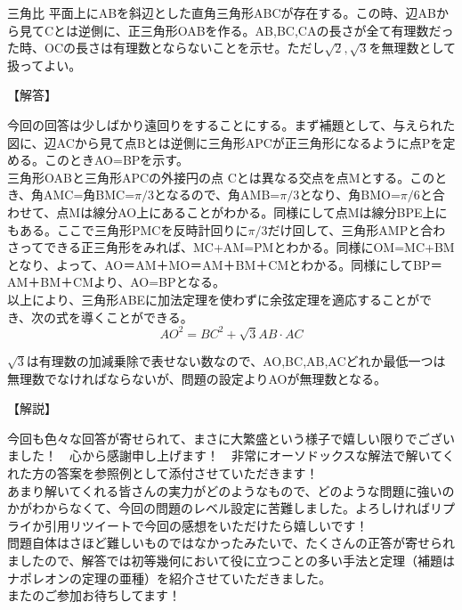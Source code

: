 \documentclass[a4paper,fleqn,dvipdfmx]{jsarticle}
\begin{document}
\newpage

\begin{itembox}[l]{三角比}
平面上にABを斜辺とした直角三角形ABCが存在する。この時、辺ABから見てCとは逆側に、正三角形OABを作る。AB,BC,CAの長さが全て有理数だった時、OCの長さは有理数とならないことを示せ。ただし$\sqrt{2},\sqrt{3}$を無理数として扱ってよい。
\end{itembox}


\begin{flushleft}
【解答】
\end{flushleft}

今回の回答は少しばかり遠回りをすることにする。まず補題として、与えられた図に、辺ACから見て点Bとは逆側に三角形APCが正三角形になるように点Pを定める。このときAO=BPを示す。\\
三角形OABと三角形APCの外接円の点 Cとは異なる交点を点Mとする。このとき、角AMC=角BMC=$\pi/3$となるので、角AMB=$\pi/3$となり、角BMO=$\pi/6$と合わせて、点Mは線分AO上にあることがわかる。同様にして点Mは線分BPE上にもある。ここで三角形PMCを反時計回りに$\pi/3$だけ回して、三角形AMPと合わさってできる正三角形をみれば、MC+AM=PMとわかる。同様にOM=MC+BMとなり、よって、AO＝AM＋MO＝AM＋BM＋CMとわかる。同様にしてBP＝AM＋BM＋CMより、AO=BPとなる。\\
以上により、三角形ABEに加法定理を使わずに余弦定理を適応することができ、次の式を導くことができる。\\

$$AO^2=BC^2+\sqrt{3}AB\cdot AC$$

$\sqrt{3}$は有理数の加減乗除で表せない数なので、AO,BC,AB,ACどれか最低一つは無理数でなければならないが、問題の設定よりAOが無理数となる。


\begin{flushleft}
【解説】
\end{flushleft}

今回も色々な回答が寄せられて、まさに大繁盛という様子で嬉しい限りでございました！　心から感謝申し上げます！　非常にオーソドックスな解法で解いてくれた方の答案を参照例として添付させていただきます！\\
あまり解いてくれる皆さんの実力がどのようなもので、どのような問題に強いのかがわからなくて、今回の問題のレベル設定に苦難しました。よろしければリプライか引用リツイートで今回の感想をいただけたら嬉しいです！\\
問題自体はさほど難しいものではなかったみたいで、たくさんの正答が寄せられましたので、解答では初等幾何において役に立つことの多い手法と定理（補題はナポレオンの定理の亜種）を紹介させていただきました。\\
またのご参加お待ちしてます！
\end{document}
